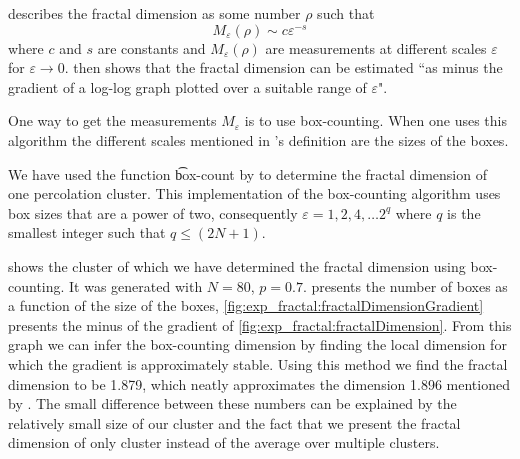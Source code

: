 
\textcite{falconer2004fractal} describes the fractal dimension as some number $\rho$ such that
\begin{equation}
	M_\varepsilon(\rho) \sim c\varepsilon^{-s}
\end{equation}
where $c$ and $s$ are constants and $M_\varepsilon(\rho)$ are measurements at different scales $\varepsilon$ for $\varepsilon \to 0$. \citeauthor{falconer2004fractal} then shows that the fractal dimension can be estimated ``as minus the gradient of a log-log graph plotted over a suitable range of $\varepsilon$"\cite{falconer2004fractal}. 

One way to get the measurements $M_\varepsilon$ is to use box-counting. When one uses this algorithm the different scales mentioned in \citeauthor{falconer2004fractal}'s definition are the sizes of the boxes.

We have used the function \t{box-count} by \textcite{boxCounting} to determine the fractal dimension of one percolation cluster. This implementation of the box-counting algorithm uses box sizes that are a power of two, consequently $\varepsilon = 1, 2, 4, \dotsc 2^q$ where $q$ is the smallest integer such that $q \leq (2N + 1)$. 

 shows the cluster of which we have determined the fractal dimension using box-counting. It was generated with $N = 80$, $p = 0.7$.  presents the number of boxes as a function of the size of the boxes, \cref{fig:exp_fractal:fractalDimensionGradient} presents the minus of the gradient of \cref{fig:exp_fractal:fractalDimension}. From this graph we can infer the box-counting dimension by finding the local dimension for which the gradient is approximately stable. Using this method we find the fractal dimension to be \num{1.879}, which neatly approximates the dimension \num{1.896} mentioned by \textcite{stauffer1994introduction}. The small difference between these numbers can be explained by the relatively small size of our cluster and the fact that we present the fractal dimension of only cluster instead of the average over multiple clusters. 

